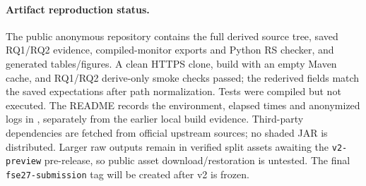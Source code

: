 \documentclass[11pt]{article}
\begin{document}
\paragraph{Artifact reproduction status.}
The public anonymous repository contains the full derived source tree, saved RQ1/RQ2 evidence, compiled-monitor exports and Python RS checker, and generated tables/figures. A clean HTTPS clone, build with an empty Maven cache, and RQ1/RQ2 derive-only smoke checks passed; the rederived fields match the saved expectations after path normalization. Tests were compiled but not executed. The README records the environment, elapsed times and anonymized logs in , separately from the earlier local build evidence. Third-party dependencies are fetched from official upstream sources; no shaded JAR is distributed. Larger raw outputs remain in verified split assets awaiting the \texttt{v2-preview} pre-release, so public asset download/restoration is untested. The final \texttt{fse27-submission} tag will be created after v2 is frozen.
\end{document}
